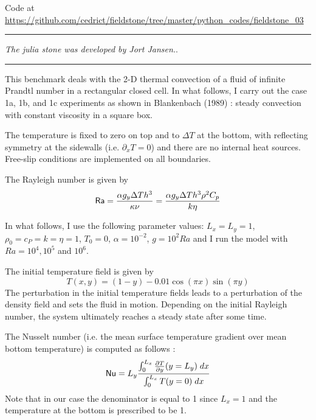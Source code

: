 

\begin{center}
Code at \url{https://github.com/cedrict/fieldstone/tree/master/python_codes/fieldstone_03}
\end{center}

\par\noindent\rule{\textwidth}{0.4pt}

{\sl The julia stone was developed by Jort Jansen.}. 

\par\noindent\rule{\textwidth}{0.4pt}

This benchmark deals with the 2-D thermal convection of a fluid 
of infinite Prandtl number in a rectangular closed cell.
In what follows, I carry out the case 1a, 1b, and 1c experiments as shown in 
Blankenbach \etal (1989) \cite{blbc89}:
steady convection with constant viscosity in a square box.

The temperature is fixed to zero on top and to $\Delta T$ at the bottom, 
with reflecting symmetry at the sidewalls (i.e. $\partial_x T=0$) 
and there are no internal heat sources. 
Free-slip conditions are implemented on all boundaries. 

The Rayleigh number is given by
\begin{equation}
{\mathsf{Ra}} = \frac{\alpha g_y \Delta T h^3 }{\kappa \nu}
=\frac{\alpha g_y \Delta T h^3 \rho^2 C_p}{k \eta}
\end{equation}

In what follows, I use the following parameter values:  %
$L_x=L_y=1$,$\rho_0=c_P=k=\eta=1$, $T_0=0$, $\alpha=10^{-2}$, $g=10^{2}Ra$
and I run the model with $Ra=10^4,10^{5}$ and $10^6$.

The initial temperature field is given by 
\begin{equation}
T(x,y)=(1-y) - 0.01\cos(\pi x) \sin(\pi y)
\end{equation}
The perturbation in the initial temperature fields leads to 
a perturbation of the density field and sets the fluid in motion. 
Depending on the initial Rayleigh number, the system ultimately reaches a 
steady state after some time. 

The Nusselt number (i.e. the mean surface temperature gradient over mean bottom temperature)
is computed as follows \cite{blbc89}:
\begin{equation}
{\mathsf{Nu}} = L_y \frac{\int_0^{L_x} \frac{\partial T}{\partial y}(y=L_y) \; dx  }{\int_0^{L_x} T(y=0) \; dx}
\label{eqNu}
\end{equation}
Note that in our case the denominator is equal to 1 since $L_x=1$ and the temperature at the 
bottom is prescribed to be 1.

